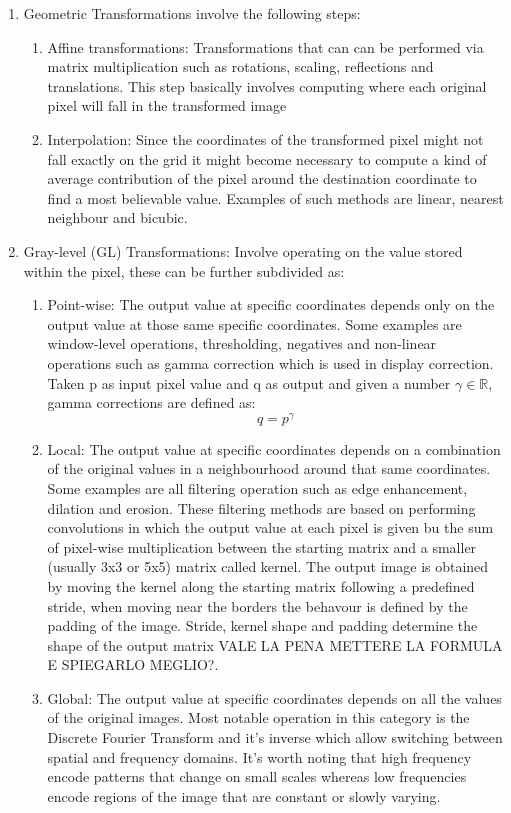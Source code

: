 \begin{enumerate}
\item Geometric Transformations involve the following steps:
		\begin{enumerate}
		\item Affine transformations: Transformations that can can be performed via matrix multiplication such as rotations, scaling, reflections and translations. This step basically involves computing where each original pixel will fall in the transformed image
		\item Interpolation: Since the coordinates of the transformed pixel might not fall exactly on the grid it might become necessary to compute a kind of average contribution of the pixel around the destination coordinate to find a most believable value. Examples of such methods are linear, nearest neighbour and bicubic. 
		\end{enumerate}
\item Gray-level (GL) Transformations: Involve operating on the value stored within the pixel, these can be further subdivided as:
		\begin{enumerate}
		\item Point-wise: The output value at specific coordinates depends only on the output value at those same specific coordinates. Some examples are window-level operations, thresholding, negatives and non-linear operations such as gamma correction which is used in display correction. Taken p as input pixel value and q as output and given a number $\gamma \in \mathbb{R}$, gamma corrections are defined as:
		\begin{equation}
		q = p^{\gamma}
		\end{equation}
		\item Local: The output value at specific coordinates depends on a combination of the original values in a neighbourhood around that same coordinates. Some examples are all filtering operation such as edge enhancement, dilation and erosion. These filtering methods are based on performing convolutions in which the output value at each pixel is given bu the sum of pixel-wise multiplication between the starting matrix and a smaller (usually 3x3 or 5x5) matrix called kernel. The output image is obtained by moving the kernel along the starting matrix following a predefined stride, when moving near the borders the behavour is defined by the padding of the image. Stride, kernel shape and padding determine the shape of the output matrix \large{VALE LA PENA METTERE LA FORMULA E SPIEGARLO MEGLIO?}.  
		\item Global: The output value at specific coordinates depends on all the values of the original images. Most notable operation in this category is the Discrete Fourier Transform and it's inverse which allow switching between spatial and frequency domains. It's worth noting that high frequency encode patterns that change on small scales whereas low frequencies encode regions of the image that are constant or slowly varying.
		\end{enumerate}
\end{enumerate}

